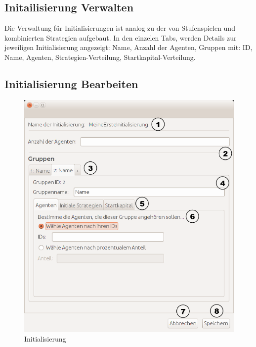 \pagebreak

\subsection{Initailisierung Verwalten}

Die Verwaltung für Initialisierungen ist analog zu der von Stufenspielen und kombinierten Strategien aufgebaut. In den einzelen Tabs, werden Details zur jeweiligen Initialisierung angezeigt: Name, Anzahl der Agenten, Gruppen mit: ID, Name, Agenten, Strategien-Verteilung, Startkapital-Verteilung.


\subsection{Initialisierung Bearbeiten}

\begin{figure}[!hp] 
  \centering
     \includegraphics[width=1.0\textwidth]{GUI_Entwurf/InitialisierungBearbeiten1.png}
  \caption{Initialisierung}
  \label{fig:Bild1}
\end{figure}


